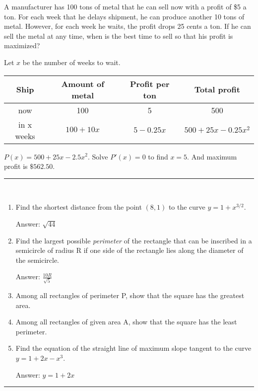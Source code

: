 \documentclass[calc1-main.tex]{subfiles}
\begin{document}
\begin{example}
  A manufacturer has 100 tons of metal that he can sell now with a profit of \$5 a ton.  For each week that he delays shipment, he can produce another 10 tons of metal.  However, for each week he waits, the profit drops 25 cents a ton.  If he can sell the metal at any time, when is the best time to sell so that his profit is maximized?
\end{example}
\begin{solution}
  Let $x$ be the number of weeks to wait.
  \begin{table}[H]
    \centering
    \begin{tabular}{|c|c|c|c|}
      \hline
      Ship & Amount of metal & Profit per ton & Total profit \\
      \hline
      now & 100 & 5 & 500 \\
      in x weeks & $100+10x$ & $5-0.25 x$ & $500+25x-0.25 x^2$\\
      \hline
    \end{tabular}
  \end{table}
  $P(x) = 500 + 25x - 2.5x^2$. Solve $P'(x) = 0$ to find $x=5$. And maximum profit is $\$562.50$.
\end{solution}

\rule{\textwidth}{1pt}
\begin{multicols}{2}
\begin{exercise}
~\\
  \begin{enumerate}
    \item Find the shortest distance from the point $(8,1)$ to the curve $y=1+x^{3/2}$.

    Answer: $\sqrt{44}$
    \item Find the largest possible \textit{perimeter} of the  rectangle that can be inscribed in a semicircle of radius R if one side of the rectangle lies along the diameter of the semicircle.

    Answer: $\frac{10 R}{\sqrt{5}}$
    \item Among all rectangles of perimeter P, show that the square has the greatest area.
    \item Among all rectangles of given area A, show that the square has the least perimeter.
    \item Find the equation of the straight line of maximum slope tangent to the curve $y=1+2x-x^3$.

    Answer: $y=1+2x$
  \end{enumerate}
\end{exercise}
\end{multicols}
\rule{\textwidth}{1pt}
\end{document}
